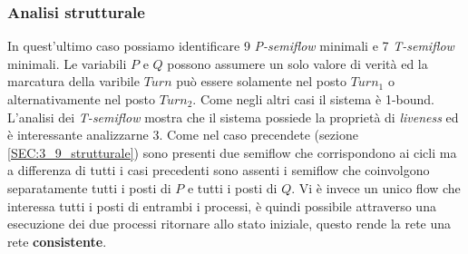 \documentclass[a4paper]{article}
\begin{document}
\subsubsection{Analisi strutturale}
In quest'ultimo caso possiamo identificare 9 \textit{P-semiflow} minimali e 7 \textit{T-semiflow} minimali. 
Le variabili $P$ e $Q$ possono assumere un solo valore di verità ed la marcatura della varibile $Turn $ può essere solamente nel posto $Turn_1$ o alternativamente nel posto $Turn_2$. 
Come negli altri casi il sistema è 1-bound.\\
L'analisi dei \textit{T-semiflow} mostra che il sistema possiede la proprietà di \textit{liveness} ed è interessante analizzarne 3.
Come nel caso precendete (sezione \ref{SEC:3_9_strutturale}) sono presenti due semiflow che corrispondono ai cicli ma a differenza di tutti i casi precedenti sono assenti i semiflow che coinvolgono separatamente tutti i posti di $P$ e tutti i posti di $Q$.
Vi è invece un unico flow che interessa tutti i posti di entrambi i processi, è quindi possibile attraverso una esecuzione dei due processi ritornare allo stato iniziale, questo rende la rete una rete \textbf{consistente}.
\end{document}
